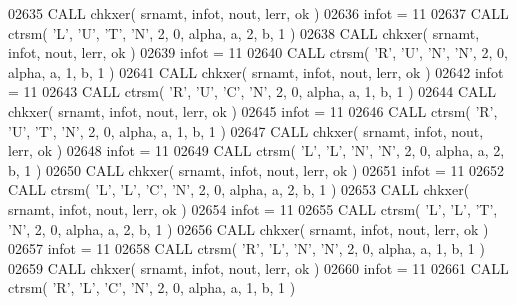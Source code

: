 \begin{DoxyCode}
02635       \textcolor{keyword}{CALL }chkxer( srnamt, infot, nout, lerr, ok )
02636       infot = 11
02637       \textcolor{keyword}{CALL }ctrsm( \textcolor{stringliteral}{'L'}, \textcolor{stringliteral}{'U'}, \textcolor{stringliteral}{'T'}, \textcolor{stringliteral}{'N'}, 2, 0, alpha, a, 2, b, 1 )
02638       \textcolor{keyword}{CALL }chkxer( srnamt, infot, nout, lerr, ok )
02639       infot = 11
02640       \textcolor{keyword}{CALL }ctrsm( \textcolor{stringliteral}{'R'}, \textcolor{stringliteral}{'U'}, \textcolor{stringliteral}{'N'}, \textcolor{stringliteral}{'N'}, 2, 0, alpha, a, 1, b, 1 )
02641       \textcolor{keyword}{CALL }chkxer( srnamt, infot, nout, lerr, ok )
02642       infot = 11
02643       \textcolor{keyword}{CALL }ctrsm( \textcolor{stringliteral}{'R'}, \textcolor{stringliteral}{'U'}, \textcolor{stringliteral}{'C'}, \textcolor{stringliteral}{'N'}, 2, 0, alpha, a, 1, b, 1 )
02644       \textcolor{keyword}{CALL }chkxer( srnamt, infot, nout, lerr, ok )
02645       infot = 11
02646       \textcolor{keyword}{CALL }ctrsm( \textcolor{stringliteral}{'R'}, \textcolor{stringliteral}{'U'}, \textcolor{stringliteral}{'T'}, \textcolor{stringliteral}{'N'}, 2, 0, alpha, a, 1, b, 1 )
02647       \textcolor{keyword}{CALL }chkxer( srnamt, infot, nout, lerr, ok )
02648       infot = 11
02649       \textcolor{keyword}{CALL }ctrsm( \textcolor{stringliteral}{'L'}, \textcolor{stringliteral}{'L'}, \textcolor{stringliteral}{'N'}, \textcolor{stringliteral}{'N'}, 2, 0, alpha, a, 2, b, 1 )
02650       \textcolor{keyword}{CALL }chkxer( srnamt, infot, nout, lerr, ok )
02651       infot = 11
02652       \textcolor{keyword}{CALL }ctrsm( \textcolor{stringliteral}{'L'}, \textcolor{stringliteral}{'L'}, \textcolor{stringliteral}{'C'}, \textcolor{stringliteral}{'N'}, 2, 0, alpha, a, 2, b, 1 )
02653       \textcolor{keyword}{CALL }chkxer( srnamt, infot, nout, lerr, ok )
02654       infot = 11
02655       \textcolor{keyword}{CALL }ctrsm( \textcolor{stringliteral}{'L'}, \textcolor{stringliteral}{'L'}, \textcolor{stringliteral}{'T'}, \textcolor{stringliteral}{'N'}, 2, 0, alpha, a, 2, b, 1 )
02656       \textcolor{keyword}{CALL }chkxer( srnamt, infot, nout, lerr, ok )
02657       infot = 11
02658       \textcolor{keyword}{CALL }ctrsm( \textcolor{stringliteral}{'R'}, \textcolor{stringliteral}{'L'}, \textcolor{stringliteral}{'N'}, \textcolor{stringliteral}{'N'}, 2, 0, alpha, a, 1, b, 1 )
02659       \textcolor{keyword}{CALL }chkxer( srnamt, infot, nout, lerr, ok )
02660       infot = 11
02661       \textcolor{keyword}{CALL }ctrsm( \textcolor{stringliteral}{'R'}, \textcolor{stringliteral}{'L'}, \textcolor{stringliteral}{'C'}, \textcolor{stringliteral}{'N'}, 2, 0, alpha, a, 1, b, 1 )

\end{DoxyCode}
